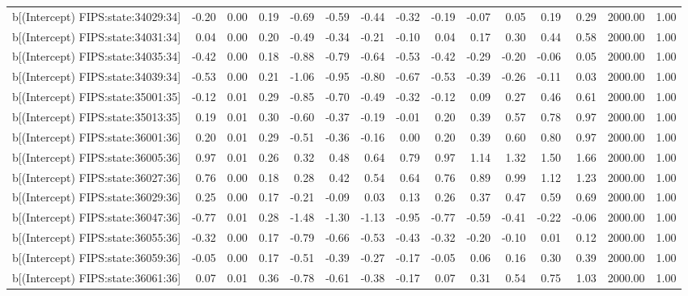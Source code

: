 \begin{table}[ht]
\begin{tabular}{rrrrrrrrrrrrrrr}
  b[(Intercept) FIPS:state:34029:34] & -0.20 & 0.00 & 0.19 & -0.69 & -0.59 & -0.44 & -0.32 & -0.19 & -0.07 & 0.05 & 0.19 & 0.29 & 2000.00 & 1.00 \\ 
  b[(Intercept) FIPS:state:34031:34] & 0.04 & 0.00 & 0.20 & -0.49 & -0.34 & -0.21 & -0.10 & 0.04 & 0.17 & 0.30 & 0.44 & 0.58 & 2000.00 & 1.00 \\ 
  b[(Intercept) FIPS:state:34035:34] & -0.42 & 0.00 & 0.18 & -0.88 & -0.79 & -0.64 & -0.53 & -0.42 & -0.29 & -0.20 & -0.06 & 0.05 & 2000.00 & 1.00 \\ 
  b[(Intercept) FIPS:state:34039:34] & -0.53 & 0.00 & 0.21 & -1.06 & -0.95 & -0.80 & -0.67 & -0.53 & -0.39 & -0.26 & -0.11 & 0.03 & 2000.00 & 1.00 \\ 
  b[(Intercept) FIPS:state:35001:35] & -0.12 & 0.01 & 0.29 & -0.85 & -0.70 & -0.49 & -0.32 & -0.12 & 0.09 & 0.27 & 0.46 & 0.61 & 2000.00 & 1.00 \\ 
  b[(Intercept) FIPS:state:35013:35] & 0.19 & 0.01 & 0.30 & -0.60 & -0.37 & -0.19 & -0.01 & 0.20 & 0.39 & 0.57 & 0.78 & 0.97 & 2000.00 & 1.00 \\ 
  b[(Intercept) FIPS:state:36001:36] & 0.20 & 0.01 & 0.29 & -0.51 & -0.36 & -0.16 & 0.00 & 0.20 & 0.39 & 0.60 & 0.80 & 0.97 & 2000.00 & 1.00 \\ 
  b[(Intercept) FIPS:state:36005:36] & 0.97 & 0.01 & 0.26 & 0.32 & 0.48 & 0.64 & 0.79 & 0.97 & 1.14 & 1.32 & 1.50 & 1.66 & 2000.00 & 1.00 \\ 
  b[(Intercept) FIPS:state:36027:36] & 0.76 & 0.00 & 0.18 & 0.28 & 0.42 & 0.54 & 0.64 & 0.76 & 0.89 & 0.99 & 1.12 & 1.23 & 2000.00 & 1.00 \\ 
  b[(Intercept) FIPS:state:36029:36] & 0.25 & 0.00 & 0.17 & -0.21 & -0.09 & 0.03 & 0.13 & 0.26 & 0.37 & 0.47 & 0.59 & 0.69 & 2000.00 & 1.00 \\ 
  b[(Intercept) FIPS:state:36047:36] & -0.77 & 0.01 & 0.28 & -1.48 & -1.30 & -1.13 & -0.95 & -0.77 & -0.59 & -0.41 & -0.22 & -0.06 & 2000.00 & 1.00 \\ 
  b[(Intercept) FIPS:state:36055:36] & -0.32 & 0.00 & 0.17 & -0.79 & -0.66 & -0.53 & -0.43 & -0.32 & -0.20 & -0.10 & 0.01 & 0.12 & 2000.00 & 1.00 \\ 
  b[(Intercept) FIPS:state:36059:36] & -0.05 & 0.00 & 0.17 & -0.51 & -0.39 & -0.27 & -0.17 & -0.05 & 0.06 & 0.16 & 0.30 & 0.39 & 2000.00 & 1.00 \\ 
  b[(Intercept) FIPS:state:36061:36] & 0.07 & 0.01 & 0.36 & -0.78 & -0.61 & -0.38 & -0.17 & 0.07 & 0.31 & 0.54 & 0.75 & 1.03 & 2000.00 & 1.00 \\ 

\end{tabular}
\end{table}

